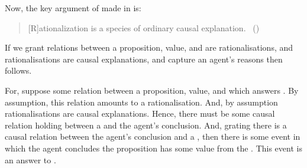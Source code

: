 \begin{note}
  Now, the key argument of made in  is:
  \begin{quote}
    [R]ationalization is a species of ordinary causal explanation.%
    \mbox{ }\hfill\mbox{(\citeyear[685]{Davidson:1963aa})}
  \end{quote}

  If we grant relations between a proposition, value, and  are rationalisations, and rationalisations are causal explanations, and  capture an agent's reasons then \issueInclusion{} follows.

  For, suppose some relation between a proposition, value, and \pool{} which answers \qWhy{}.
  By assumption, this relation amounts to a rationalisation.
  And, by assumption rationalisations are causal explanations.
  Hence, there must be some causal relation holding between a  and the agent's conclusion.
  And, grating there is a causal relation between the agent's conclusion and a , then there is some event in which the agent concludes the proposition has some value from the .
  This event is an answer to \qHow{}.
\end{note}


